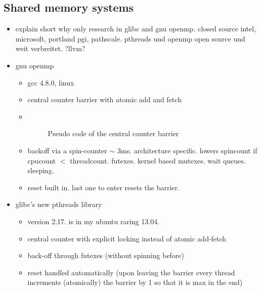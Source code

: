 \documentclass[a4paper, 10pt]{article}
\begin{document}
\subsection{Shared memory systems}
\begin{itemize}
	\item explain short why only research in glibc and gnu openmp. closed source intel, microsoft, portland pgi, pathscale. pthreads und openmp open source und weit verbreitet. ?llvm?
	\item gnu openmp
		\begin{itemize}
			\item gcc 4.8.0, linux
			\item central counter barrier with atomic add and fetch
			\item ~
				\begin{figure}[htbp]
					\centering
					
					\caption{Pseudo code of the central counter barrier}
					\label{listing:add-fetch-no-reset}
				\end{figure}

			\item backoff via a spin-counter $\sim$ 3ms. architecture specific. lowers spincount if cpucount $<$ threadcount. futexes. kernel based mutexes. wait queues. sleeping.
			\item reset built in. last one to enter resets the barrier.
		\end{itemize}
	\item glibc's new pthreads library
		\begin{itemize}
			\item version 2.17. is in my ubuntu raring 13.04.
			\item central counter with explicit locking instead of atomic add-fetch
			\item back-off through futexes (without spinning before)
			\item reset handled automatically (upon leaving the barrier every thread increments (atomically) the barrier by 1 so that it is max in the end)
		\end{itemize}
\end{itemize}
\end{document}
